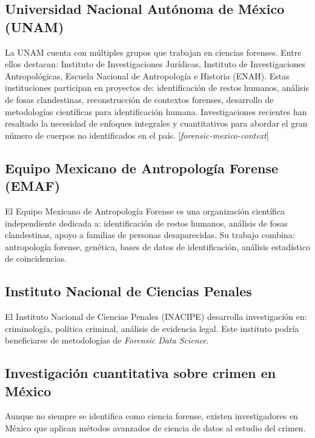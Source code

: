 \documentclass[a4paper,10pt,oneside]{article}
\begin{document}
\subsection{Universidad Nacional Aut\'onoma de M\'exico (UNAM)}

La UNAM cuenta con m\'ultiples grupos que trabajan en ciencias forenses. Entre ellos destacan: Instituto de Investigaciones Jur\'idicas, Instituto de Investigaciones Antropol\'ogicas, Escuela Nacional de Antropolog\'ia e Historia (ENAH). Estas instituciones participan en proyectos de: identificaci\'on de restos humanos, an\'alisis de fosas clandestinas, reconstrucci\'on de contextos forenses,  desarrollo de metodolog\'ias cient\'ificas para identificaci\'on humana. Investigaciones recientes han resaltado la necesidad de enfoques integrales y cuantitativos para abordar el gran n\'umero de cuerpos no identificados en el pa\'is. [\textit{forensic-mexico-context}]

\subsection{Equipo Mexicano de Antropolog\'ia Forense (EMAF)}

El Equipo Mexicano de Antropolog\'ia Forense es una organizaci\'on cient\'ifica independiente dedicada a: identificaci\'on de restos humanos, an\'alisis de fosas clandestinas, apoyo a familias de personas desaparecidas. Su trabajo combina: antropolog\'ia forense, gen\'etica, bases de datos de identificaci\'on, an\'alisis estad\'istico de coincidencias.

\subsection{Instituto Nacional de Ciencias Penales}

El Instituto Nacional de Ciencias Penales (INACIPE) desarrolla investigaci\'on en:  criminolog\'ia, pol\'itica criminal, an\'alisis de evidencia legal. Este instituto podr\'ia beneficiarse de metodolog\'ias de \textit{Forensic Data Science}.

\subsection{Investigaci\'on cuantitativa sobre crimen en M\'exico}

Aunque no siempre se identifica como ciencia forense, existen investigadores en M\'exico que aplican m\'etodos avanzados de ciencia de datos al estudio del crimen.
\end{document}
